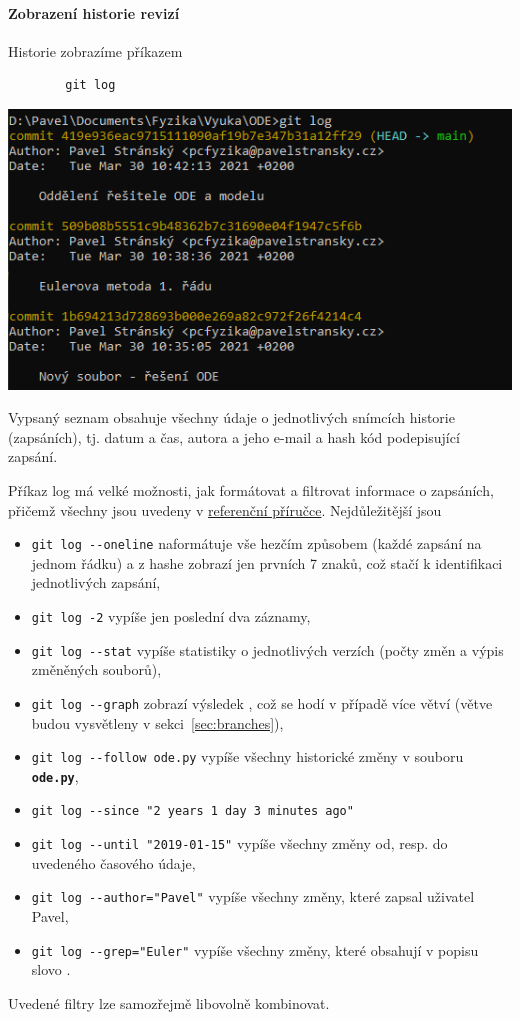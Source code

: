 \documentclass[a4paper,11pt,twoside]{article}
\newcommand{\subsubsubsection}[1]{\paragraph{#1}\mbox{}

}
\def\code#1{\textnormal{\texttt{#1}}}
\def\file#1{\textnormal{\textbf{\texttt{#1}}}}
\theoremstyle{red}
\theoremstyle{green}
\begin{document}
\subsubsubsection{Zobrazení historie revizí}
\label{sec:gitlog}
    Historie zobrazíme příkazem
    \begin{lstlisting}
        git log\end{lstlisting}
    \begin{center}\includegraphics[width=0.7\linewidth]{GitLog.png}\end{center}
    Vypsaný seznam obsahuje všechny údaje o jednotlivých snímcích historie (zapsáních), tj. datum a čas, autora a jeho e-mail a hash kód podepisující zapsání.

    Příkaz log má velké možnosti, jak formátovat a filtrovat informace o zapsáních, přičemž všechny jsou uvedeny v \href{https://git-scm.com/docs/git-log}{referenční příručce}.
    Nejdůležitější jsou
    \begin{itemize}
        \item \code{git log -{}-oneline} naformátuje vše hezčím způsobem (každé zapsání na jednom řádku) a z hashe zobrazí jen prvních 7 znaků, což stačí k identifikaci jednotlivých zapsání,
        \item \code{git log -2} vypíše jen poslední dva záznamy,
        \item \code{git log -{}-stat} vypíše statistiky o jednotlivých verzích (počty změn a výpis změněných souborů),
        \item \code{git log -{}-graph} zobrazí výsledek , což se hodí v případě více větví (větve budou vysvětleny v sekci~\ref{sec:branches}),
        \item \code{git log -{}-follow ode.py} vypíše všechny historické změny v souboru \file{ode.py},
        \item \code{git log -{}-since "2 years 1 day 3 minutes ago"} 
        \item \code{git log -{}-until "2019-01-15"} vypíše všechny změny od, resp. do uvedeného časového údaje,
        \item \code{git log -{}-author="Pavel"} vypíše všechny změny, které zapsal uživatel Pavel,
        \item \code{git log -{}-grep="Euler"} vypíše všechny změny, které obsahují v popisu slovo .
    \end{itemize}
    Uvedené filtry lze samozřejmě libovolně kombinovat.
\end{document}

